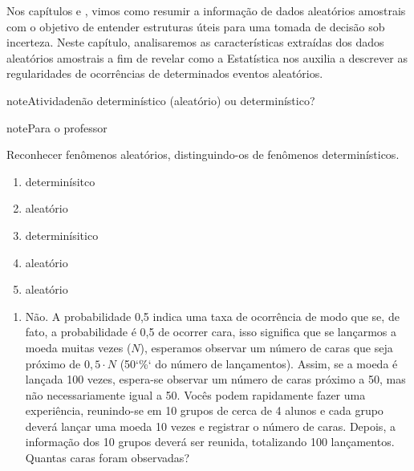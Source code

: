 Nos capítulos  e , vimos como resumir a informação de dados aleatórios amostrais com o objetivo de  entender estruturas úteis para uma tomada de decisão sob incerteza. Neste capítulo, analisaremos as características extraídas dos dados aleatórios amostrais a fim de revelar como a Estatística nos auxilia a descrever as regularidades de ocorrências de determinados eventos aleatórios.
\begin{sphinxadmonition}{note}{Atividade}{não determinístico (aleatório) ou determinístico?}
\label{ativ-aleatorioversusdeterministico}

\begin{sphinxadmonition}{note}{Para o professor}

 Reconhecer fenômenos aleatórios, distinguindo-os de fenômenos determinísticos.
\begin{quote}
\end{quote}
\begin{enumerate}
\item {} 
determinísitco

\item {} 
aleatório

\item {} 
determinísitico

\item {} 
aleatório

\item {} 
aleatório

\end{enumerate}
\begin{enumerate}
\item {} 
Não. A probabilidade 0,5 indica uma taxa de ocorrência de modo que se, de fato, a probabilidade é 0,5 de ocorrer cara, isso significa que se lançarmos a moeda muitas vezes (\(N\)), esperamos observar um número de caras que seja próximo de \(0,5\cdot N\) (50{}`\%{}` do número de lançamentos). Assim, se a moeda é lançada 100 vezes, espera-se observar um número de caras próximo a 50, mas não necessariamente igual a 50. Vocês podem rapidamente fazer uma experiência, reunindo-se em 10 grupos de cerca de 4 alunos e cada grupo deverá lançar uma moeda 10 vezes e registrar o número de caras. Depois, a informação dos 10 grupos deverá ser reunida, totalizando 100 lançamentos. Quantas caras foram observadas?


\end{enumerate}
\end{sphinxadmonition}
\end{sphinxadmonition}
